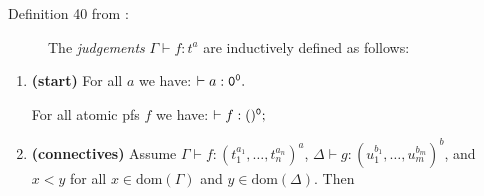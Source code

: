\documentclass{article}
\begin{document}
\begin{description}

\item[Definition 40 from \cite{types40}:] The {\em
judgements}\/ $\Gamma\vdash f:t^a$ are inductively defined as follows:

\end{description}
\begin{enumerate}
\item\label{rtt1} {\bf (start)} For all $a$ we have: $\vdash a:\tt 0^0.$

\hspace{0.5in} For all atomic pfs $f$ we have: $\vdash f:\tt ()^0;$
\item\label{rtt2} {\bf (connectives)} Assume
        $\Gamma\vdash f{:}{(t_1^{a_1},\dots,t_n^{a_n})}^a$,
        $\Delta\vdash g{:}{(u_1^{b_1},\dots,u_m^{b_m})}^b$, and
        $x<y$ for all $x\in\mbox{dom}(\Gamma)$ and $y\in\mbox{dom}(\Delta)$.
        Then


\end{enumerate}
\end{document}
